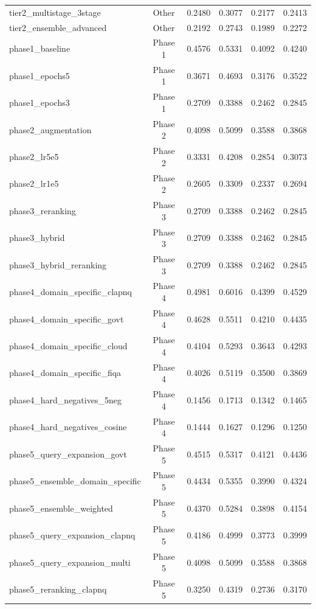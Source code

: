 \begin{longtable}{lccccc}
tier2\_multistage\_3stage & Other & 0.2480 & 0.3077 & 0.2177 & 0.2413 \\
tier2\_ensemble\_advanced & Other & 0.2192 & 0.2743 & 0.1989 & 0.2272 \\
phase1\_baseline & Phase 1 & 0.4576 & 0.5331 & 0.4092 & 0.4240 \\
phase1\_epochs5 & Phase 1 & 0.3671 & 0.4693 & 0.3176 & 0.3522 \\
phase1\_epochs3 & Phase 1 & 0.2709 & 0.3388 & 0.2462 & 0.2845 \\
phase2\_augmentation & Phase 2 & 0.4098 & 0.5099 & 0.3588 & 0.3868 \\
phase2\_lr5e5 & Phase 2 & 0.3331 & 0.4208 & 0.2854 & 0.3073 \\
phase2\_lr1e5 & Phase 2 & 0.2605 & 0.3309 & 0.2337 & 0.2694 \\
phase3\_reranking & Phase 3 & 0.2709 & 0.3388 & 0.2462 & 0.2845 \\
phase3\_hybrid & Phase 3 & 0.2709 & 0.3388 & 0.2462 & 0.2845 \\
phase3\_hybrid\_reranking & Phase 3 & 0.2709 & 0.3388 & 0.2462 & 0.2845 \\
phase4\_domain\_specific\_clapnq & Phase 4 & 0.4981 & 0.6016 & 0.4399 & 0.4529 \\
phase4\_domain\_specific\_govt & Phase 4 & 0.4628 & 0.5511 & 0.4210 & 0.4435 \\
phase4\_domain\_specific\_cloud & Phase 4 & 0.4104 & 0.5293 & 0.3643 & 0.4293 \\
phase4\_domain\_specific\_fiqa & Phase 4 & 0.4026 & 0.5119 & 0.3500 & 0.3869 \\
phase4\_hard\_negatives\_5neg & Phase 4 & 0.1456 & 0.1713 & 0.1342 & 0.1465 \\
phase4\_hard\_negatives\_cosine & Phase 4 & 0.1444 & 0.1627 & 0.1296 & 0.1250 \\
phase5\_query\_expansion\_govt & Phase 5 & 0.4515 & 0.5317 & 0.4121 & 0.4436 \\
phase5\_ensemble\_domain\_specific & Phase 5 & 0.4434 & 0.5355 & 0.3990 & 0.4324 \\
phase5\_ensemble\_weighted & Phase 5 & 0.4370 & 0.5284 & 0.3898 & 0.4154 \\
phase5\_query\_expansion\_clapnq & Phase 5 & 0.4186 & 0.4999 & 0.3773 & 0.3999 \\
phase5\_query\_expansion\_multi & Phase 5 & 0.4098 & 0.5099 & 0.3588 & 0.3868 \\
phase5\_reranking\_clapnq & Phase 5 & 0.3250 & 0.4319 & 0.2736 & 0.3170 \\

\end{longtable}
